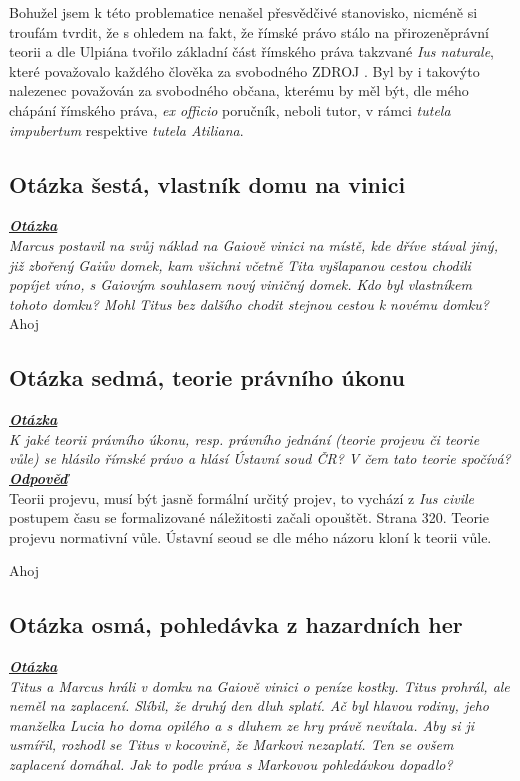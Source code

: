 \documentclass{article}
\begin{document}
Bohužel jsem k této problematice nenašel přesvědčivé stanovisko, nicméně si troufám tvrdit, že s ohledem na fakt, že římské právo stálo na přirozeněprávní teorii a dle Ulpiána tvořilo základní část římského práva takzvané \textit{Ius naturale}, které považovalo každého člověka za svobodného ZDROJ . Byl by i takovýto nalezenec považován za svobodného občana, kterému by měl být, dle mého chápání římského práva, \textit{ex officio} poručník, neboli tutor, v rámci \textit{tutela impubertum} respektive \textit{tutela Atiliana}.

\subsection{Otázka šestá, vlastník domu na vinici}
\textbf{\textit{\underline{Otázka}}}\\
\textit{Marcus postavil na svůj náklad na Gaiově vinici na místě, kde dříve stával jiný, již zbořený Gaiův domek, kam všichni včetně Tita vyšlapanou cestou chodili popíjet víno, s Gaiovým souhlasem nový viničný domek. Kdo byl vlastníkem tohoto domku? Mohl Titus bez dalšího chodit stejnou cestou k novému domku?}\\
Ahoj

\subsection{Otázka sedmá, teorie právního úkonu}
\textbf{\textit{\underline{Otázka}}}\\
\textit{K jaké teorii právního úkonu, resp. právního jednání (teorie projevu či teorie vůle) se hlásilo římské právo a hlásí Ústavní soud ČR? V čem tato teorie spočívá?}\\

\noindent\noindent\textbf{\textit{\underline{Odpověď}}}\\

Teorii projevu, musí být jasně formální určitý projev, to vychází z \textit{Ius civile} postupem času se formalizované náležitosti začali opouštět.
Strana 320.
Teorie projevu normativní vůle.
Ústavní seoud se dle mého názoru kloní k teorii vůle.

Ahoj

\subsection{Otázka osmá, pohledávka z hazardních her}
\textbf{\textit{\underline{Otázka}}}\\
\textit{Titus a Marcus hráli v domku na Gaiově vinici o peníze kostky. Titus prohrál, ale neměl na zaplacení. Slíbil, že druhý den dluh splatí. Ač byl hlavou rodiny, jeho manželka Lucia ho doma opilého a s dluhem ze hry právě nevítala. Aby si ji usmířil, rozhodl se Titus v kocovině, že Markovi nezaplatí. Ten se ovšem zaplacení domáhal. Jak to podle práva s Markovou pohledávkou dopadlo?}\\
\end{document}
